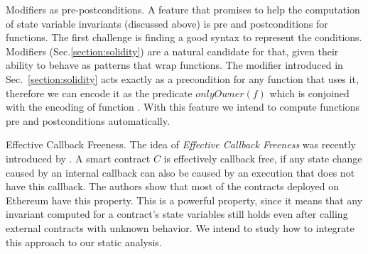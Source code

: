 \begin{paragraph}{Modifiers as pre-postconditions.}
A feature that promises to help the computation of state variable invariants
(discussed above) is pre and postconditions for functions.
%
The first challenge is finding a good syntax to represent the conditions.
%
Modifiers (Sec.\ref{section:solidity}) are a natural candidate for that, given
their ability to behave as patterns that wrap functions.
%
The modifier  introduced in Sec.~\ref{section:solidity} acts
exactly as a precondition for any function that uses it, therefore we can
encode it as the predicate $onlyOwner(f)$ which is conjoined with the encoding
of function .
%
With this feature we intend to compute functions pre and postconditions
automatically.
\end{paragraph}

\begin{paragraph}{Effective Callback Freeness.}
The idea of \emph{Effective Callback Freeness} was recently introduced by
\cite{Grossman}.
%
A smart contract $C$ is effectively callback free, if any state change caused
by an internal callback can also be caused by an execution that does not have this callback.
%
The authors show that most of the contracts deployed on Ethereum have this
property.
%
This is a powerful property, since it means that any invariant computed for a
contract's state variables still holds even after calling external contracts
with unknown behavior.
%
We intend to study how to integrate this approach to our static analysis.
\end{paragraph}

